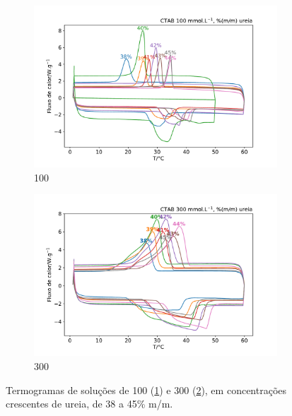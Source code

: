 	\begin{figure}[h]
		\begin{subfigure}[t]{0.45\textwidth}
			\centering
			\includegraphics[width=\textwidth]{./imagens/dsc/CTAB_porc_ur}
			\caption{\CTAB{} 100 \mM{}}
			\label{fig:DSC_CTAB100_UR38-45}	
		\end{subfigure}\qquad%
		\begin{subfigure}[t]{0.45\textwidth}
			\centering
			\includegraphics[width=\textwidth]{./imagens/dsc/CTAB_300_porc_ur}
			\caption{\CTAB{} 300 \mM}
			\label{fig:DSC_CTAB300_UR38-45}
		\end{subfigure}
		\caption{Termogramas de soluções de \CTAB{} 100 \mM{} (\ref{fig:DSC_CTAB100_UR38-45}) e 300 \mM{} (\ref{fig:DSC_CTAB300_UR38-45}), em concentrações crescentes de ureia, de 38 a 45\% m/m.}
		\label{fig:DSC_CTAB_100_300_Ur38-45}
	\end{figure}
	
